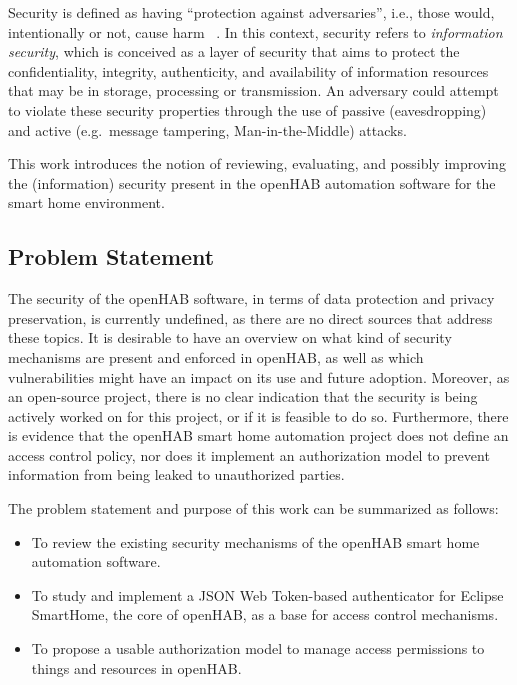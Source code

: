 \documentclass[12pt]{article}
\begin{document}
Security is defined as having ``protection against adversaries'', i.e., those would, intentionally or not, cause harm~\cite{whitman2011principles} . In this context, security refers to \emph{information security}, which is conceived as a layer of security that aims to protect the confidentiality, integrity, authenticity, and availability of information resources that may be in storage, processing or transmission. An adversary could attempt to violate these security properties through the use of passive (eavesdropping) and active (e.g.\ message tampering, Man-in-the-Middle) attacks.

This work introduces the notion of reviewing, evaluating, and possibly improving the (information) security present in the openHAB automation software for the smart home environment. 

\subsection{Problem Statement}

The security of the openHAB software, in terms of data protection and privacy preservation, is currently undefined, as there are no direct sources that address these topics. It is desirable to have an overview on what kind of security mechanisms are present and enforced in openHAB, as well as which vulnerabilities might have an impact on its use and future adoption. Moreover, as an open-source project, there is no clear indication that the security is being actively worked on for this project, or if it is feasible to do so. Furthermore, there is evidence that the openHAB smart home automation project does not define an access control policy, nor does it implement an authorization model to prevent information from being leaked to unauthorized parties.

\noindent The problem statement and purpose of this work can be summarized as follows:
\begin{itemize}
\item To review the existing security mechanisms of the openHAB smart home automation software.
\item To study and implement a JSON Web Token-based authenticator for Eclipse SmartHome, the core of openHAB, as a base for access control mechanisms.
\item To propose a usable authorization model to manage access permissions to things and resources in openHAB. 
\end{itemize}
\end{document}
